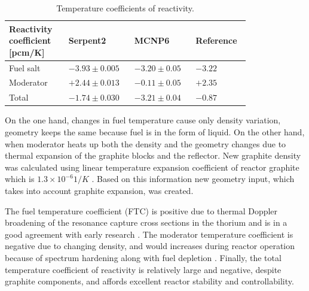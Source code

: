 \documentclass{anstrans}
\begin{document}
\captionsetup[table]{
  labelsep = newline,
  name = TABLE, 
  justification=justified,
  singlelinecheck=false,%
  labelsep=colon,%
  skip = \medskipamount}
\begin{table}[h!]
\begin{tabular}{p{0.22\linewidth} p{0.22\linewidth} p{0.21\linewidth} p{0.15\linewidth}} \toprule
   Reactivity coefficient [pcm/K]  & Serpent2      & MCNP6 \cite{park_whole_2015}   & Reference \cite{robertson_conceptual_1971}      
\\ \midrule
Fuel salt        & $-3.93\pm0.005$ & $-3.20\pm0.05$ & $-3.22$ 
\\ \midrule
Moderator        & $+2.44\pm0.013$ & $-0.11\pm0.05$ & $+2.35$ 
\\ \midrule
Total            & $-1.74\pm0.030$ & $-3.21\pm0.04$ & $-0.87$ 
\\
\bottomrule
\end{tabular}
  \caption{Temperature coefficients of reactivity.}
  \label{tab:tcoef}
\end{table}
On the one hand, changes in fuel temperature cause only density variation, geometry keeps the same because fuel is in the form of liquid. On the other hand, when moderator heats up both the density and the geometry changes due to thermal expansion of the graphite blocks and the reflector. New graphite density was calculated using linear temperature expansion coefficient of reactor graphite which is $1.3\times10^{-6}1/K$ \cite{robertson_conceptual_1971}. Based on this information new geometry input, which takes into account graphite expansion, was created.

The fuel temperature coefficient (FTC) is positive due to thermal Doppler broadening of the resonance capture cross sections in the thorium and is in a good agreement with early research \cite{robertson_conceptual_1971,park_whole_2015}. The moderator temperature coefficient is negative due to changing density, and would increases during reactor operation because of spectrum hardening along with fuel depletion \cite{park_whole_2015}. Finally, the total temperature coefficient of reactivity is relatively large and negative, despite graphite components, and affords excellent reactor stability and controllability.
\end{document}
